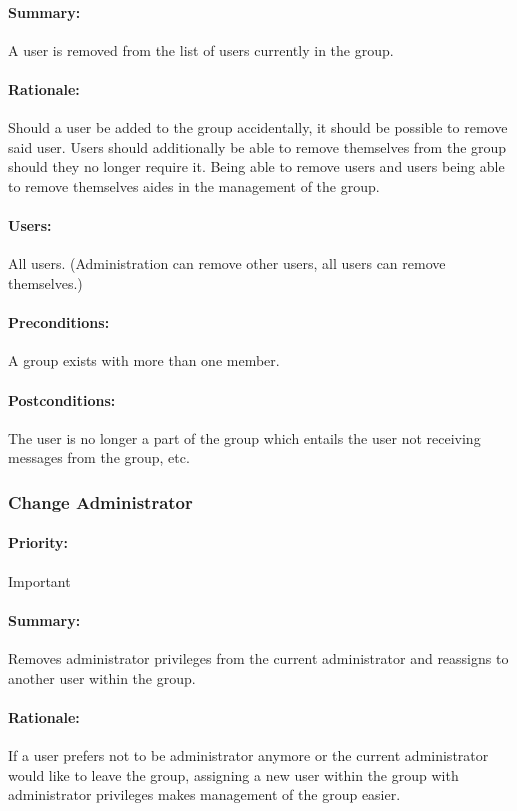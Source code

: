 \documentclass[11pt]{article}
\begin{document}
\paragraph{Summary:}
A user is removed from the list of users currently in the group.
\paragraph{Rationale:}
Should a user be added to the group accidentally, it should be possible to remove said user. Users should additionally be able to remove themselves from the group should they no longer require it. Being able to remove users and users being able to remove themselves aides in the management of the group.
\paragraph{Users:}
All users. (Administration can remove other users, all users can remove themselves.)
\paragraph{Preconditions:}
A group exists with more than one member.
\paragraph{{Postconditions:}}
The user is no longer a part of the group which entails the user not receiving messages from the group, etc.
\subsubsection{Change Administrator} \label{UC-change-admin}
\paragraph{Priority:} Important
\paragraph{Summary:}
Removes administrator privileges from the current administrator and reassigns to another user within the group.
\paragraph{Rationale:}
If a user prefers not to be administrator anymore or the current administrator would like to leave the group, assigning a new user within the group with administrator privileges makes management of the group easier.
\end{document}
